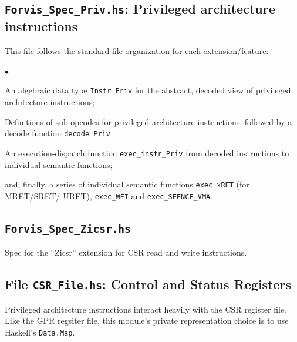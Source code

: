 \documentclass[11pt]{article}
\newenvironment{tightlist}%
{\begin{list}{$\bullet$}{%
    \setlength{\topsep}{0in}
    \setlength{\partopsep}{0in}
    \setlength{\itemsep}{0in}
    \setlength{\parsep}{0in}
    \setlength{\leftmargin}{1.5em}
    \setlength{\rightmargin}{0in}
    \setlength{\itemindent}{0in}
}
}%
{\end{list}
}
\begin{document}



\subsection{{\tt Forvis\_Spec\_Priv.hs}: Privileged architecture instructions}

This file follows the standard file organization for each extension/feature:

\begin{tightlist}

\item An algebraic data type \verb|Instr_Priv| for the abstract,
decoded view of privileged architecture instructions;

\item Definitions of sub-opcodes for privileged architecture
instructions, followed by a decode function \verb|decode_Priv|

\item An execution-dispatch function \verb|exec_instr_Priv| from
decoded instructions to individual semantic functions;

\item and, finally, a series of individual semantic functions
\verb|exec_xRET| (for MRET/SRET/ URET), \verb|exec_WFI| and
\verb|exec_SFENCE_VMA|.

\end{tightlist}


\subsection{\tt Forvis\_Spec\_Zicsr.hs}

Spec for the ``Zicsr'' extension for CSR read and write instructions.


\subsection{File {\tt CSR\_File.hs}: Control and Status Registers}

\label{sec_csrs}

Privileged architecture instructions interact heavily with the CSR
register file.  Like the GPR regsiter file, this module's private
representation choice is to use Haskell's \verb|Data.Map|.
\end{document}
